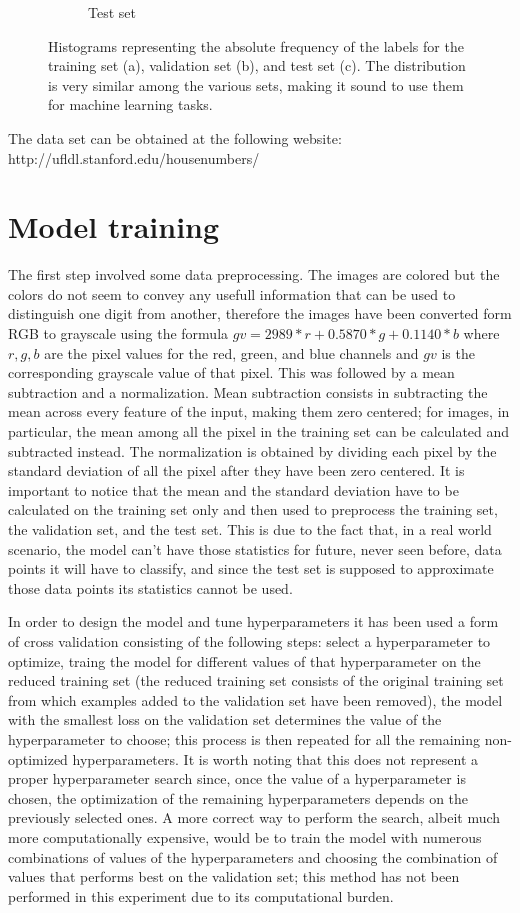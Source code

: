 \documentclass[12pt]{article}
\begin{document}
\begin{figure}[h]
\begin{subfigure}{0.31\textwidth}
		\caption{Test set}
		\label{fig:histc}
	\end{subfigure}
	\caption{Histograms representing the absolute frequency of the labels for the training set (a), validation set (b), and test set (c). The distribution is very similar among the various sets, making it sound to use them for machine learning tasks.}
	\label{fig:hist}
\end{figure}
The data set can be obtained at the following website: http://ufldl.stanford.edu/housenumbers/

\section*{Model training}

The first step involved some data preprocessing. The images are colored but the colors do not seem to convey any usefull information that can be used to distinguish one digit from another, therefore the images have been converted form RGB to grayscale using the formula $ gv = 2989*r+0.5870*g+0.1140*b $ where $r, g, b$ are the pixel values for the red, green, and blue channels and $gv$ is the corresponding grayscale value of that pixel. This was followed by a mean subtraction and a normalization. Mean subtraction consists in subtracting the mean across every feature of the input, making them zero centered; for images, in particular, the mean among all the pixel in the training set can be calculated and subtracted instead. The normalization is obtained by dividing each pixel by the standard deviation of all the pixel after they have been zero centered. It is important to notice that the mean and the standard deviation have to be calculated on the training set only and then used to preprocess the training set, the validation set, and the test set. This is due to the fact that, in a real world scenario, the model can't have those statistics for future, never seen before, data points it will have to classify, and since the test set is supposed to approximate  those data points its statistics cannot be used.

In order to design the model and tune hyperparameters it has been used a form of cross validation consisting of the following steps: select a hyperparameter to optimize, traing the model for different values of that hyperparameter on the reduced training set (the reduced training set consists of the original training set from which examples added to the validation set have been removed), the model with the smallest loss on the validation set determines the value of the hyperparameter to choose; this process is then repeated for all the remaining non-optimized hyperparameters. It is worth noting that this does not represent a proper hyperparameter search since, once the value of a hyperparameter is chosen, the optimization of the remaining hyperparameters depends on the previously selected ones. A more correct way to perform the search, albeit much more computationally expensive, would be to train the model with numerous combinations of values of the hyperparameters and choosing the combination of values that performs best on the validation set; this method has not been performed in this experiment due to its computational burden.
\end{document}
